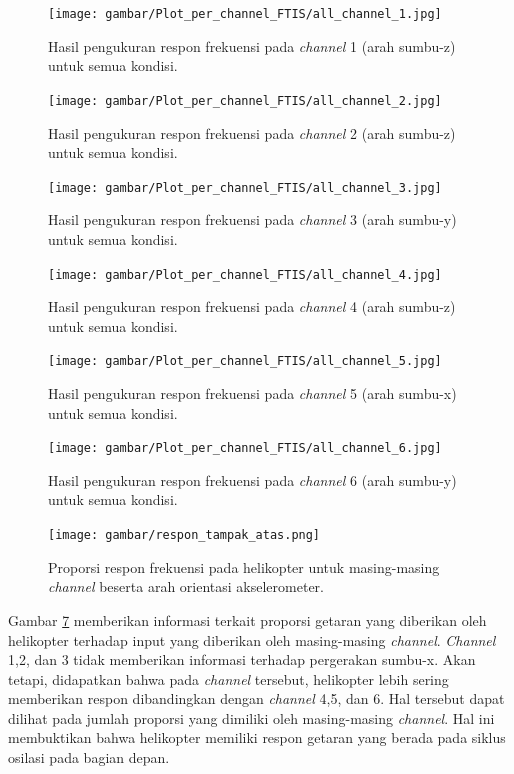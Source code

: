 \begin{figure}[H]
	\centering
	\texttt{[image: gambar/Plot\_per\_channel\_FTIS/all\_channel\_1.jpg]}
	\caption{Hasil pengukuran respon frekuensi pada \textit{channel} 1 (arah sumbu-z) untuk semua kondisi.}
	\label{fig:channel_1}
\end{figure}

\begin{figure}[h]
	\centering
	\texttt{[image: gambar/Plot\_per\_channel\_FTIS/all\_channel\_2.jpg]}
	\caption{Hasil pengukuran respon frekuensi pada \textit{channel} 2 (arah sumbu-z) untuk semua kondisi.}
	\label{fig:channel_2}
\end{figure}

\begin{figure}[]
	\centering
	\texttt{[image: gambar/Plot\_per\_channel\_FTIS/all\_channel\_3.jpg]}
	\caption{Hasil pengukuran respon frekuensi pada \textit{channel} 3 (arah sumbu-y) untuk semua kondisi.}
	\label{fig:channel_3}
\end{figure}

\begin{figure}[H]
	\centering
	\texttt{[image: gambar/Plot\_per\_channel\_FTIS/all\_channel\_4.jpg]}
	\caption{Hasil pengukuran respon frekuensi pada \textit{channel} 4 (arah sumbu-z) untuk semua kondisi.}
	\label{fig:channel_4}
\end{figure}

\begin{figure}[h]
	\centering
	\texttt{[image: gambar/Plot\_per\_channel\_FTIS/all\_channel\_5.jpg]}
	\caption{Hasil pengukuran respon frekuensi pada \textit{channel} 5 (arah sumbu-x) untuk semua kondisi.}
	\label{fig:channel_5}
\end{figure}

\begin{figure}[H]
	\centering
	\texttt{[image: gambar/Plot\_per\_channel\_FTIS/all\_channel\_6.jpg]}
	\caption{Hasil pengukuran respon frekuensi pada \textit{channel} 6 (arah sumbu-y) untuk semua kondisi.}
	\label{fig:channel_6}
\end{figure}

\begin{figure}[H]
	\centering
	\texttt{[image: gambar/respon\_tampak\_atas.png]}
	\caption{Proporsi respon frekuensi pada helikopter untuk masing-masing \textit{channel} beserta arah orientasi akselerometer.}
	\label{fig:respon_tampak_atas}
\end{figure}

Gambar \ref{fig:respon_tampak_atas} memberikan informasi terkait proporsi getaran yang diberikan oleh helikopter terhadap input yang diberikan oleh masing-masing \textit{channel}. \textit{Channel} 1,2, dan 3 tidak memberikan informasi terhadap pergerakan sumbu-x. Akan tetapi, didapatkan bahwa pada \textit{channel} tersebut, helikopter lebih sering memberikan respon dibandingkan dengan \textit{channel} 4,5, dan 6. Hal tersebut dapat dilihat pada jumlah proporsi yang dimiliki oleh masing-masing \textit{channel}. Hal ini membuktikan bahwa helikopter memiliki respon getaran yang berada pada siklus osilasi pada bagian depan.

